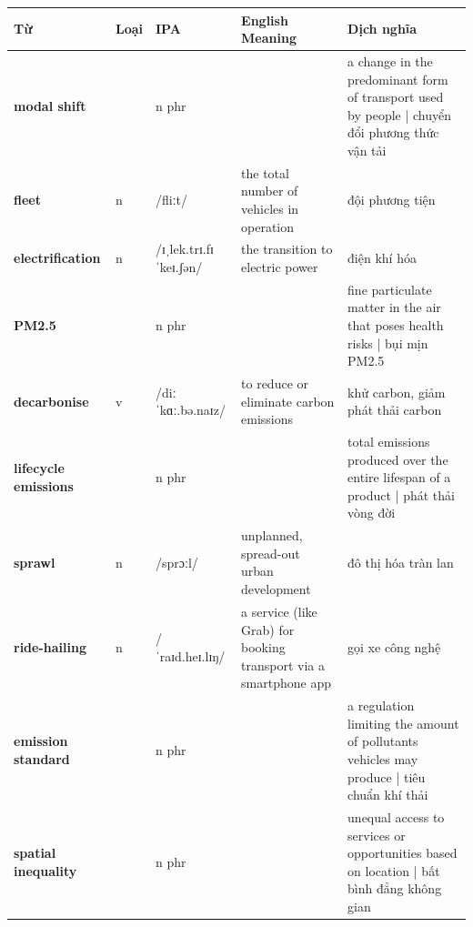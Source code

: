 \vspace{0.8em}
\begin{center}
\renewcommand{\arraystretch}{1.65}
\begin{tabularx}{\textwidth}{|V{0.22\textwidth}|C{0.07\textwidth}|I{0.20\textwidth}|Y|V{0.18\textwidth}|}
\hline
{}
\textbf{Từ} & \textbf{Loại} & \textbf{IPA} & \textbf{English Meaning} & \textbf{Dịch nghĩa} \\
\hline
\textbf{modal shift} & & n phr & & a change in the predominant form of transport used by people | chuyển đổi phương thức vận tải \\ \hline
\textbf{fleet} & n & /fliːt/ & the total number of vehicles in operation & đội phương tiện \\ \hline
\textbf{electrification} & n & /ɪˌlek.trɪ.fɪˈkeɪ.ʃən/ & the transition to electric power & điện khí hóa \\ \hline
\textbf{PM2.5} & & n phr & & fine particulate matter in the air that poses health risks | bụi mịn PM2.5 \\ \hline
\textbf{decarbonise} & v & /diːˈkɑː.bə.naɪz/ & to reduce or eliminate carbon emissions & khử carbon, giảm phát thải carbon \\ \hline
\textbf{lifecycle emissions} & & n phr & & total emissions produced over the entire lifespan of a product | phát thải vòng đời \\ \hline
\textbf{sprawl} & n & /sprɔːl/ & unplanned, spread-out urban development & đô thị hóa tràn lan \\ \hline
\textbf{ride-hailing} & n & /ˈraɪd.heɪ.lɪŋ/ & a service (like Grab) for booking transport via a smartphone app & gọi xe công nghệ \\ \hline
\textbf{emission standard} & & n phr & & a regulation limiting the amount of pollutants vehicles may produce | tiêu chuẩn khí thải \\ \hline
\textbf{spatial inequality} & & n phr & & unequal access to services or opportunities based on location | bất bình đẳng không gian \\ \hline
\end{tabularx}
\end{center}

\newpage

